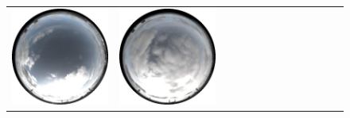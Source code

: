 \begin{figure}
\begin{tabular}{@{}rcccccccccccc@{}}
    \includegraphics[width=\customwidth]{./figures/database/20141108_120025.jpg} &
    \includegraphics[width=\customwidth]{./figures/database/20141108_123025.jpg} &

\end{tabular}
\end{figure}
